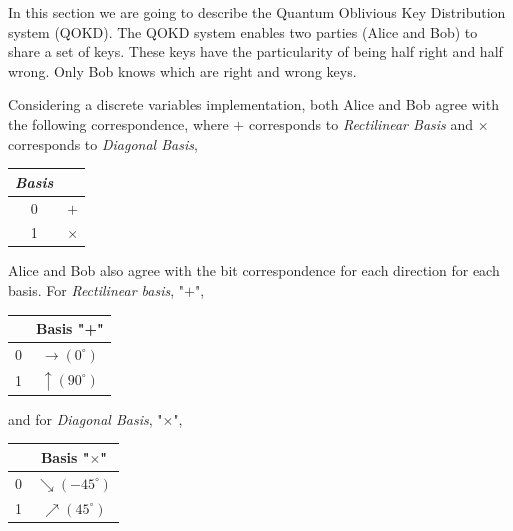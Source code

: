 In this section we are going to describe the Quantum Oblivious Key Distribution system (QOKD).
The QOKD system enables two parties (Alice and Bob) to share a set of keys. These keys have the particularity of being half right and half wrong. Only Bob knows which are right and wrong keys.

Considering a discrete variables implementation, both Alice and Bob agree with the following correspondence, where $+$ corresponds to \textit{Rectilinear Basis} and $\times$ corresponds to \textit{Diagonal Basis},

\begin{table}[H]
\centering
\begin{tabular}{c|c}
\textbf{\textit{Basis}}         &  \\ \hline
 0 & $+$ \\
 1 & $\times$ \\
\end{tabular}
\end{table}
Alice and Bob also agree with the bit correspondence for each direction for each basis. For \textit{Rectilinear basis}, "$+$",

\begin{table}[H]
\centering
\begin{tabular}{c|c}
            & Basis "+" \\ \hline
 0 & $\to (0^{\circ})$ \\
 1 & $\uparrow (90^{\circ})$ \\
\end{tabular}
\end{table}
and for \textit{Diagonal Basis}, "$\times$",

\begin{table}[H]
\centering
\begin{tabular}{c|c}
      & Basis "$\times$" \\ \hline
 0 & $\searrow (-45^{\circ})$ \\
 1 & $\nearrow (45^{\circ})$ \\
\end{tabular}
\end{table}

